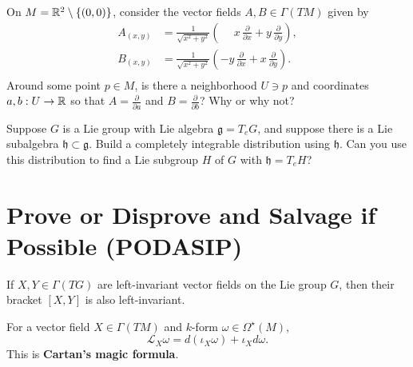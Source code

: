 \documentclass{homework}
\begin{document}
\begin{problem} On $M = \mathbb{R}^2 \setminus \{ (0,0) \}$, consider the
vector fields $A, B \in \Gamma(TM)$ given by
  \begin{align*}
    A_{(x,y)} &= \frac{1}{\sqrt{x^2 + y^2}} \left( \phantom{-} x \, \frac{\partial}{\partial x} + y\, \frac{\partial}{\partial y} \right), \\
    B_{(x,y)} &=  \frac{1}{\sqrt{x^2 + y^2}} \left( -y \,\frac{\partial}{\partial x} + x\, \frac{\partial}{\partial y} \right). \\
  \end{align*} Around some point $p \in M$, is there a neighborhood $U
\ni p$ and coordinates $a, b : U \to \mathbb{R}$ so that $A =
\frac{\partial}{\partial a}$ and $B = \frac{\partial}{\partial b}$?
Why or why not?
\end{problem}

\begin{problem} Suppose $G$ is a Lie group with Lie algebra
$\mathfrak{g} = T_e G$, and suppose there is a Lie subalgebra
$\mathfrak{h} \subset \mathfrak{g}$.  Build a completely integrable
distribution using $\mathfrak{h}$.
Can you use this distribution to find a Lie subgroup $H$ of $G$ with
$\mathfrak{h} = T_e H$?
\end{problem}

\section{Prove or Disprove and Salvage if Possible (PODASIP)}

\begin{problem} If $X, Y \in \Gamma(TG)$ are left-invariant vector
fields on the Lie group $G$, then their bracket $[X,Y]$ is also
left-invariant.
\end{problem}

\begin{problem}
For a vector field $X \in \Gamma(TM)$ and $k$-form $\omega \in \Omega^\star(M)$,
\[
  {\mathcal {L}}_{X}\omega =d(\iota _{X}\omega )+\iota _{X}d\omega.
\]
This is \textbf{Cartan's magic formula}.
\end{problem}
\end{document}
